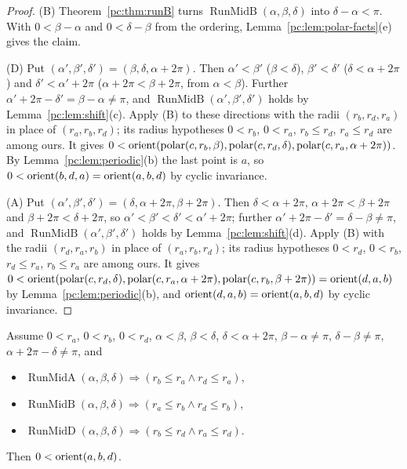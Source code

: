 \begin{proof}
(B) Theorem~\ref{pc:thm:runB} turns $\operatorname{RunMidB}(\alpha,\beta,\delta)$ into $\delta-\alpha<\pi$. With
$0<\beta-\alpha$ and $0<\delta-\beta$ from the ordering, Lemma~\ref{pc:lem:polar-facts}(e) gives the claim.

(D) Put $(\alpha',\beta',\delta')=(\beta,\delta,\alpha+2\pi)$. Then $\alpha'<\beta'$ ($\beta<\delta$),
$\beta'<\delta'$ ($\delta<\alpha+2\pi$) and $\delta'<\alpha'+2\pi$ ($\alpha+2\pi<\beta+2\pi$, from $\alpha<\beta$).
Further $\alpha'+2\pi-\delta'=\beta-\alpha\neq\pi$, and $\operatorname{RunMidB}(\alpha',\beta',\delta')$ holds by
Lemma~\ref{pc:lem:shift}(c). Apply (B) to these directions with the radii $(r_b,r_d,r_a)$ in place of
$(r_a,r_b,r_d)$; its radius hypotheses $0<r_b$, $0<r_a$, $r_b\le r_d$, $r_a\le r_d$ are among ours. It gives
$0<\operatorname{orient}(\operatorname{polar}(c,r_b,\beta),\operatorname{polar}(c,r_d,\delta),\operatorname{polar}(c,r_a,\alpha+2\pi))$.
By Lemma~\ref{pc:lem:periodic}(b) the last point is $a$, so $0<\operatorname{orient}(b,d,a)=\operatorname{orient}(a,b,d)$ by cyclic invariance.

(A) Put $(\alpha',\beta',\delta')=(\delta,\alpha+2\pi,\beta+2\pi)$. Then $\delta<\alpha+2\pi$,
$\alpha+2\pi<\beta+2\pi$ and $\beta+2\pi<\delta+2\pi$, so $\alpha'<\beta'<\delta'<\alpha'+2\pi$; further
$\alpha'+2\pi-\delta'=\delta-\beta\neq\pi$, and $\operatorname{RunMidB}(\alpha',\beta',\delta')$ holds by
Lemma~\ref{pc:lem:shift}(d). Apply (B) with the radii $(r_d,r_a,r_b)$ in place of $(r_a,r_b,r_d)$; its radius
hypotheses $0<r_d$, $0<r_b$, $r_d\le r_a$, $r_b\le r_a$ are among ours. It gives
$0<\operatorname{orient}(\operatorname{polar}(c,r_d,\delta),\operatorname{polar}(c,r_a,\alpha+2\pi),
\operatorname{polar}(c,r_b,\beta+2\pi))=\operatorname{orient}(d,a,b)$ by Lemma~\ref{pc:lem:periodic}(b), and
$\operatorname{orient}(d,a,b)=\operatorname{orient}(a,b,d)$ by cyclic invariance.
\end{proof}

\begin{theorem}\label{pc:thm:phase}
Assume $0<r_a$, $0<r_b$, $0<r_d$, $\alpha<\beta$, $\beta<\delta$, $\delta<\alpha+2\pi$, $\beta-\alpha\neq\pi$,
$\delta-\beta\neq\pi$, $\alpha+2\pi-\delta\neq\pi$, and
\begin{itemize}
\item $\operatorname{RunMidA}(\alpha,\beta,\delta)\Rightarrow(r_b\le r_a\wedge r_d\le r_a)$,
\item $\operatorname{RunMidB}(\alpha,\beta,\delta)\Rightarrow(r_a\le r_b\wedge r_d\le r_b)$,
\item $\operatorname{RunMidD}(\alpha,\beta,\delta)\Rightarrow(r_b\le r_d\wedge r_a\le r_d)$.
\end{itemize}
Then $0<\operatorname{orient}(a,b,d)$.
\end{theorem}

